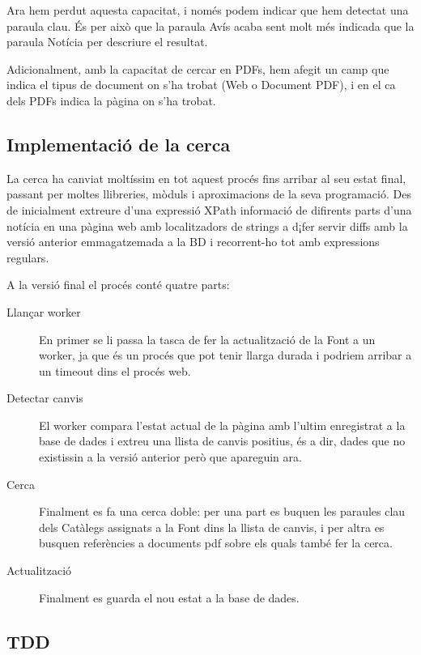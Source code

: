 \documentclass{article}
\begin{document}
Ara hem perdut aquesta capacitat, i només podem indicar que hem detectat una paraula clau. És per això que la paraula Avís acaba sent molt més indicada que la paraula Notícia per descriure el resultat.

Adicionalment, amb la capacitat de cercar en PDFs, hem afegit un camp que indica el tipus de document on s'ha trobat (Web o Document PDF), i en el ca dels PDFs indica la pàgina on s'ha trobat.

\newpage

\subsection{Implementació de la cerca}

La cerca ha canviat moltíssim en tot aquest procés fins arribar al seu estat final, passant per moltes llibreries, mòduls i aproximacions de la seva programació. Des de inicialment extreure d'una expressió XPath informació de difirents parts d'una notícia en una pàgina web amb localitzadors de strings a d¡fer servir diffs amb la versió anterior emmagatzemada a la BD i recorrent-ho tot amb expressions regulars.

A la versió final el procés conté quatre parts:

\begin{description}
    \item[Llançar worker] En primer se li passa la tasca de fer la actualització de la Font a un worker, ja que és un procés que pot tenir llarga durada i podriem arribar a un timeout dins el procés web.
    \item[Detectar canvis] El worker compara l'estat actual de la pàgina amb l'ultim enregistrat a la base de dades i extreu una llista de canvis positius, és a dir, dades que no existissin a la versió anterior però que apareguin ara.
    \item[Cerca] Finalment es fa una cerca doble: per una part es buquen les paraules clau dels Catàlegs assignats a la Font dins la llista de canvis, i per altra es busquen referències a documents pdf sobre els quals també fer la cerca.
    \item[Actualització] Finalment es guarda el nou estat a la base de dades.
\end{description}

\newpage

\subsection{TDD}
\end{document}
